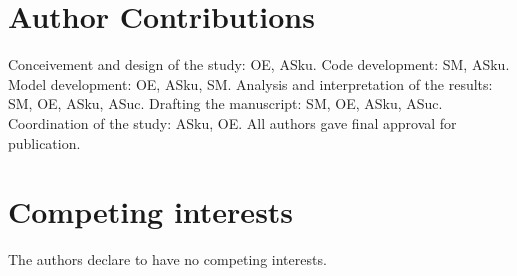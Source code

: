 \documentclass[oneside, 10pt, a4paper, twocolumn]{article}
\begin{document}
\section*{Author Contributions}

Conceivement and design of the study: OE, ASku. 
Code development: SM, ASku. 
Model development: OE, ASku, SM. 
Analysis and interpretation of the results: SM, OE, ASku, ASuc. 
Drafting the manuscript: SM, OE, ASku, ASuc. 
Coordination of the study: ASku, OE. 
All authors gave final approval for publication.

\section*{Competing interests}

The authors declare to have no competing interests.







%
%



\clearpage


\end{document}
